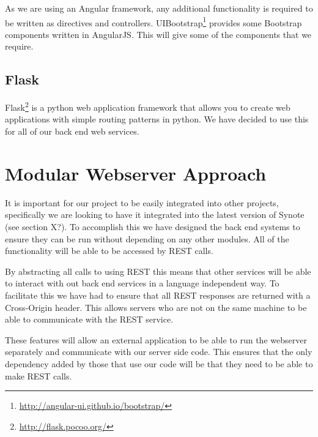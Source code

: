 As we are using an Angular framework, any additional functionality is required to be written as directives and controllers. UIBootstrap\footnote{\url{http://angular-ui.github.io/bootstrap/}} provides some Bootstrap components written in AngularJS. This will give some of the components that we require.

\subsection{Flask}
\label{Section:Flask}
Flask\footnote{\url{http://flask.pocoo.org/}} is a python web application framework that allows you to create web applications with simple routing patterns in python. We have decided to use this for all of our back end web services.

\section{Modular Webserver Approach}
\label{Section:Modular Approach}
It is important for our project to be easily integrated into other projects, specifically we are looking to have it integrated into the latest version of Synote (see section X?). To accomplish this we have designed the back end systems to ensure they can be run without depending on any other modules. All of the functionality will be able to be accessed by REST calls.

By abstracting all calls to using REST this means that other services will be able to interact with out back end services in a language independent way. To facilitate this we have had to ensure that all REST responses are returned with a Cross-Origin header. This allows servers who are not on the same machine to be able to communicate with the REST service.

These features will allow an external application to be able to run the webserver separately and communicate with our server side code. This ensures that the only dependency added by those that use our code will be that they need to be able to make REST calls.